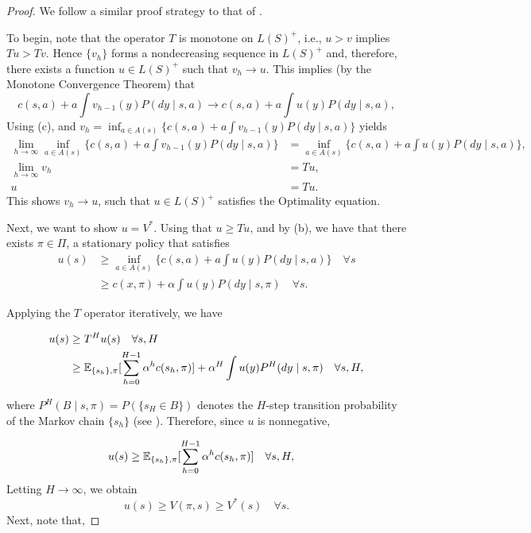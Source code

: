 \begin{proof}
We follow a similar proof strategy to that of \citet[Theorem 4.2]{hernandez1992discrete}. 

To begin, note that the operator \( T \) is monotone on \( L(S)^+ \), i.e., \( u > v \) implies \( T u > T v \). Hence \( \{v_h\} \) forms a nondecreasing sequence in \( L(S)^+ \) and, therefore, there exists a function \( u \in L(S)^+ \) such that \( v_h \to u \). This implies (by the Monotone Convergence Theorem) that
\[
c(s, a) + a \int v_{h-1}(y) P(dy \mid s, a) \to c(s, a) + a \int u(y) P(dy \mid s, a),
\]
Using (c), and $v_h=\inf_{a\in A(s)}\{c(s, a) + a \int v_{h-1}(y) P(dy \mid s, a)\}$ yields
\begin{align*}
\lim_{h\to\infty}\inf_{a\in A(s)}\{c(s, a) + a \int v_{h-1}(y) P(dy \mid s, a)\} &= \inf_{a\in A(s)}\{c(s, a) + a \int u(y) P(dy \mid s, a)\},\\
\lim_{h\to\infty}v_h &= Tu,\\
u &= T u.
\end{align*}
This shows  \( v_h \to u \), such that \( u \in L(S)^+ \) satisfies the Optimality equation. 



Next, we want to show \( u = V^* \). Using that \( u \geq T u \), and by (b), we have that there exists \( \pi \in \Pi \), a stationary policy that satisfies
\begin{align}
    u(s) &\geq \inf_{a\in A(s)}\{c(s, a) + a \int u(y) P(dy \mid s, a)\} \quad \forall s\\
    &\geq c(x, \pi) + \alpha \int u(y) P(dy \mid s, \pi) \quad \forall s.
\end{align}

Applying the $T$ operator iteratively, we have

\begin{align}
    u(s)&\geq T^{H}u(s) \quad \forall s,H\\
&\geq  \mathbb{E}_{\{s_h\},\pi}[\sum_{h=0}^{H-1} \alpha^h  c(s_h, \pi)] + \alpha^{H} \int u(y) P^{H}(dy \mid s, \pi) \quad \forall s,H,
\end{align}

where \( P^H(B \mid s, \pi) = P(\{ s_H \in B \}) \) denotes the \( H \)-step transition probability of the Markov chain \( \{ s_h \} \) (see \citet[Remarks 3.1,3.2]{hernandez1992discrete}).  Therefore, since \( u \) is nonnegative,

\begin{align}
    u(s)&\geq  \mathbb{E}_{\{s_h\},\pi}[\sum_{h=0}^{H-1} \alpha^h  c(s_h, \pi)] \quad \forall s,H,
\end{align}
Letting \( H \to \infty \), we obtain
\[
u(s) \geq V(\pi, s) \geq V^{*}(s) \quad \forall s.
\]
Next, note that, 


\end{proof}
